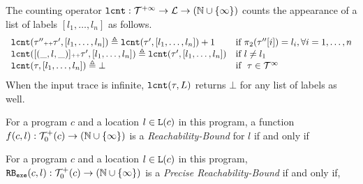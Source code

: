 \begin{defn}
  \label{def:lcounter}
  The counting operator $\mathtt{lcnt} : \mathcal{T}^{+\infty} \to \mathcal{L} \to (\mathbb{N} \cup \{\infty\})$
  counts the appearance of a list of labels $[l_1, \ldots, l_n]$ as follows.
\[
  \begin{array}{ll}
  \mathtt{lcnt}(\mathtt{\tau}'' {\scriptscriptstyle ++} \mathtt{\tau}', [l_1, \ldots, l_n] ) 
  \triangleq \mathtt{lcnt}(\mathtt{\tau}', [l_1, \ldots, l_n]) + 1  & \text{if}~ \pi_2(\mathtt{\tau}''[i]) = l_i, \forall i = 1, \ldots, n
  \\ 
  \mathtt{lcnt}([(\_, l, \_)] {\scriptscriptstyle ++} \mathtt{\tau}', [l_1, \ldots, l_n] ) 
  \triangleq \mathtt{lcnt}(\mathtt{\tau}', [l_1, \ldots, l_n]) & \text{if}~ l \neq l_1
  \\ 
  \mathtt{lcnt}(\mathtt{\tau}, [l_1, \ldots, l_n] ) 
  \triangleq \bot & \text{if }~ \mathtt{\tau} \in \mathcal{T}^{\infty}
\end{array}
\]
{When the input trace is infinite, $\mathtt{lcnt}(\mathtt{\tau}, L)$ returns $\bot$ for any list of labels as well.}
\end{defn}
%
\begin{defn}
  \label{def:rb}
  For a program ${c}$ and a location $l \in \mathtt{L}(c)$ in this program,
a function $f(c, l) : \mathcal{T}^{+}_0(c) \to (\mathbb{N} \cup \{\infty\})$ is a \emph{Reachability-Bound} for $l$ if and only if
\end{defn}
\begin{defn}
  \label{def:exe_rb}
  For a program ${c}$ and a location $l \in \mathtt{L}(c)$ in this program,
$\mathtt{RB_{exe}}({c}, l): \mathcal{T}^{+}_0(c) \to (\mathbb{N} \cup \{\infty\})$ is a \emph{Precise Reachability-Bound}  if and only if,
\highlight{
\[
\begin{array}{l}
  \forall \trace_0 \in \ftdom_0(c), c' \in \cdom, l, l' \in \lvar(c), \trace \in \tdom \st 
  \\ \qquad
  \Big(
    \config{{c}, \trace_0} \to^{*} \config{\clabel{\eskip}^{l'}, \trace_0 \tracecat \trace} 
    \lor 
    \config{{c}, \trace_0} \uparrow^{\infty} \trace_0 \tracecat \trace 
  \Big)
  \implies \exeRB({c}, l)(\trace_0) = \counter(\trace, l) 
  \end{array}
  \]
}
\end{defn}
